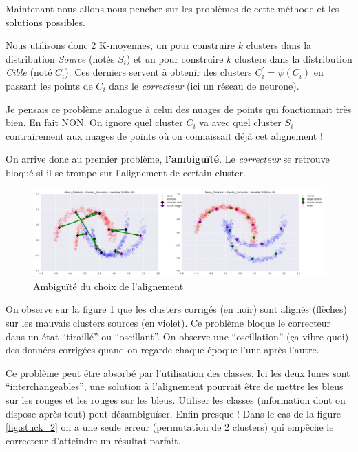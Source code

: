 Maintenant nous allons nous pencher sur les problèmes de cette méthode et 
les solutions possibles.



Nous utilisons donc 2 K-moyennes, un pour construire $k$ clusters dans la 
distribution \emph{Source} (notés $S_i$) et un pour construire $k$ clusters
dans la distribution \emph{Cible} (noté $C_i$). Ces derniers servent à
obtenir des clusters $C_i^\prime = \psi(C_i)$ en passant les points de $C_i$
dans le \emph{correcteur} (ici un réseau de neurone).

Je pensais ce problème analogue à celui des nuages de points qui fonctionnait
très bien. En fait NON. On ignore quel cluster $C_i$ va avec quel cluster
$S_i$ contrairement aux nuages de points où on connaissait déjà cet alignement !

On arrive donc au premier problème, \textbf{l'ambiguïté}. Le \emph{correcteur}
se retrouve bloqué si il se trompe sur l'alignement de certain cluster.

\begin{figure}[H] %
\centering
\includegraphics[width=\linewidth]{fig/21-04-2016/stuck_blue-red.png}
\caption{Ambiguïté du choix de l'alignement}
\label{fig:stuck_red_blue}
\end{figure}
On observe sur la figure \ref{fig:stuck_red_blue} que les clusters corrigés 
(en noir) sont alignés (flèches) sur les mauvais clusters sources (en violet).
Ce problème bloque le correcteur dans un état ``tiraillé'' ou ``oscillant''.
On observe une ``oscillation'' (ça vibre quoi) des données corrigées quand 
on regarde chaque époque l'une après l'autre.

Ce problème peut être absorbé par l'utilisation des classes. Ici les deux 
lunes sont ``interchangeables'', une solution à l'alignement pourrait être 
de mettre les bleus sur les rouges et les rouges sur les bleus.
Utiliser les classes (information dont on dispose après tout) peut 
désambiguïser. Enfin presque ! Dans le cas de la figure \ref{fig:stuck_2}
on a une seule erreur (permutation de 2 clusters) qui empêche le correcteur
d'atteindre un résultat parfait.

